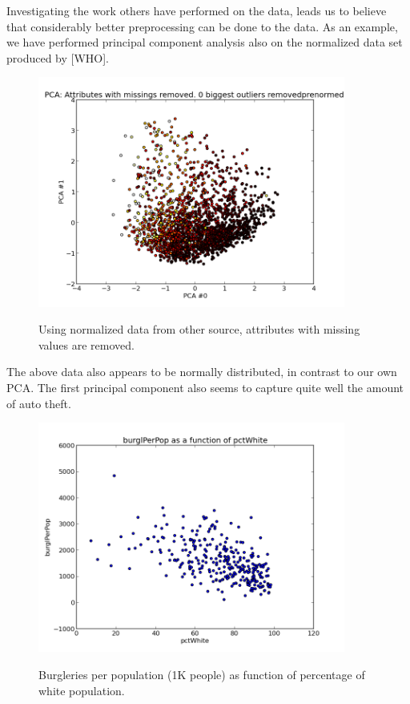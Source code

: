 Investigating the work others have performed on the data, leads us to believe that considerably better preprocessing can be done to the data. As an example, we have performed principal component analysis also on the normalized data set produced by [WHO].

\begin{figure}[H]
\centering
\includegraphics[width=0.9\textwidth]{pca/attr-with-missings-removed_0-biggest-outliers-removed_prenormed_}
\label{fig:prenorm_attrrem_0out}
\caption{Using normalized data from other source, attributes with missing values are removed.}
\end{figure}

The above data also appears to be normally distributed, in contrast to our own PCA. The first principal component also seems to capture quite well the amount of auto theft.

\begin{figure}[H]
\centering
\includegraphics[width=0.9\textwidth]{correlations/burglPerPop-as-func-of-pctWhite.png}
\label{fig:prenorm_attrrem_0out}
\caption{Burgleries per population (1K people) as function of percentage of white population.}
\end{figure}

